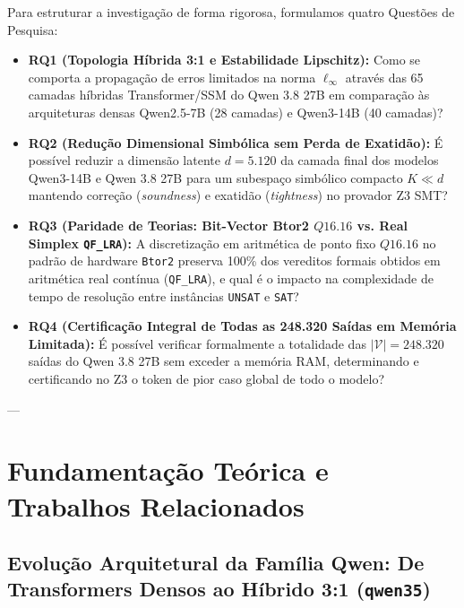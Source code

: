 \documentclass[11pt,a4paper]{article}
\theoremstyle{definition}
\begin{document}
Para estruturar a investigação de forma rigorosa, formulamos quatro Questões de Pesquisa:
\begin{itemize}
    \item \textbf{RQ1 (Topologia Híbrida 3:1 e Estabilidade Lipschitz):} Como se comporta a propagação de erros limitados na norma $\ell_\infty$ através das 65 camadas híbridas Transformer/SSM do Qwen 3.8 27B em comparação às arquiteturas densas Qwen2.5-7B (28 camadas) e Qwen3-14B (40 camadas)?
    \item \textbf{RQ2 (Redução Dimensional Simbólica sem Perda de Exatidão):} É possível reduzir a dimensão latente $d = 5.120$ da camada final dos modelos Qwen3-14B e Qwen 3.8 27B para um subespaço simbólico compacto $K \ll d$ mantendo correção (\textit{soundness}) e exatidão (\textit{tightness}) no provador Z3 SMT?
    \item \textbf{RQ3 (Paridade de Teorias: Bit-Vector Btor2 $Q16.16$ vs. Real Simplex \texttt{QF\_LRA}):} A discretização em aritmética de ponto fixo $Q16.16$ no padrão de hardware \texttt{Btor2} preserva 100\% dos vereditos formais obtidos em aritmética real contínua (\texttt{QF\_LRA}), e qual é o impacto na complexidade de tempo de resolução entre instâncias \texttt{UNSAT} e \texttt{SAT}?
    \item \textbf{RQ4 (Certificação Integral de Todas as 248.320 Saídas em Memória Limitada):} É possível verificar formalmente a totalidade das $|\mathcal{V}| = 248.320$ saídas do Qwen 3.8 27B sem exceder a memória RAM, determinando e certificando no Z3 o token de pior caso global de todo o modelo?
\end{itemize}

---

\section{Fundamentação Teórica e Trabalhos Relacionados}

\subsection{Evolução Arquitetural da Família Qwen: De Transformers Densos ao Híbrido 3:1 (\texttt{qwen35})}
\end{document}
